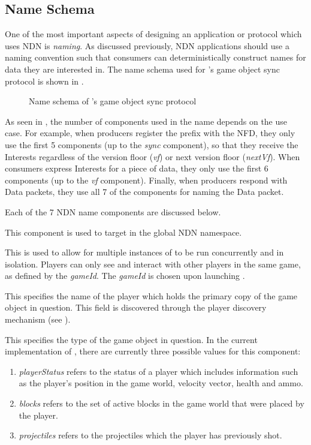 \subsection{Name Schema}\label{sec:des:naming}
One of the most important aspects of designing an application or protocol which uses NDN is \textit{naming}. As discussed previously, NDN applications should use a naming convention such that consumers can deterministically construct names for data they are interested in. The name schema used for \game{}'s game object sync protocol is shown in .

\begin{figure}[H]
    \centering
    \caption{Name schema of \game{}'s game object sync protocol}
    \label{fig:des:sync-protocol-name}
\end{figure}

As seen in , the number of components used in the name depends on the use case. For example, when producers register the prefix with the NFD, they only use the first 5 components (up to the \textit{sync} component), so that they receive the Interests regardless of the version floor (\textit{vf}) or next version floor (\textit{nextVf}). When consumers express Interests for a piece of data, they only use the first 6 components (up to the \textit{vf} component). Finally, when producers respond with Data packets, they use all 7 of the components for naming the Data packet.

Each of the 7 NDN name components are discussed below.

This component is used to target \game{} in the global NDN namespace.

This is used to allow for multiple instances of \game{} to be run concurrently and in isolation. Players can only see and interact with other players in the same game, as defined by the \textit{gameId}. The \textit{gameId} is chosen upon launching \game{}.

This specifies the name of the player which holds the primary copy of the game object in question. This field is discovered through the player discovery mechanism (see ).

This specifies the type of the game object in question. In the current implementation of \game{}, there are currently three possible values for this component:
\begin{enumerate}
    \item \textit{playerStatus} refers to the status of a player which includes information such as the player's position in the game world, velocity vector, health and ammo.
    \item \textit{blocks} refers to the set of active blocks in the game world that were placed by the player.
    \item \textit{projectiles} refers to the projectiles which the player has previously shot.
\end{enumerate}

